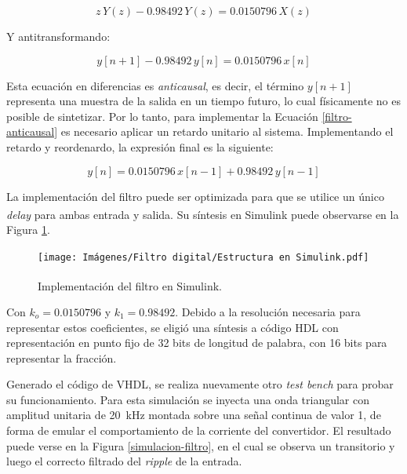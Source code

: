 \begin{equation*}
    z \, Y(z) - 0.98492 \, Y(z) = 0.0150796 \, X(z)
\end{equation*}

Y antitransformando:

\begin{equation}
    y[n+1] - 0.98492 \, y[n] = 0.0150796 \, x[n]
    \label{filtro-anticausal}
\end{equation}

Esta ecuación en diferencias es \emph{anticausal}, es decir, el término $y[n+1]$ representa una muestra de la salida en un tiempo futuro, lo cual físicamente no es posible de sintetizar. Por lo tanto, para implementar la Ecuación \ref{filtro-anticausal} es necesario aplicar un retardo unitario al sistema. Implementando el retardo y reordenardo, la expresión final es la siguiente:

\begin{equation}
    \boxed{y[n] = 0.0150796 \, x[n-1] + 0.98492 \, y[n-1]}
\end{equation}

La implementación del filtro puede ser optimizada para que se utilice un único \emph{delay} para ambas entrada y salida. Su síntesis en Simulink\textsuperscript\textregistered \hspace{0.6pt} puede observarse en la Figura \ref{estructura-filtro}.

\begin{figure}[hbt!]
    \centering
    \texttt{[image: Imágenes/Filtro digital/Estructura en Simulink.pdf]}    
    \caption{Implementación del filtro en Simulink\textsuperscript\textregistered.}
    \label{estructura-filtro}
\end{figure}

Con $k_o = 0.0150796$ y $k_1 = 0.98492$. Debido a la resolución necesaria para representar estos coeficientes, se eligió una síntesis a código HDL con representación en punto fijo de 32 bits de longitud de palabra, con 16 bits para representar la fracción.

Generado el código de VHDL, se realiza nuevamente otro \emph{test bench} para probar su funcionamiento. Para esta simulación se inyecta una onda triangular con amplitud unitaria de \SI{20}{\kilo\hertz} montada sobre una señal continua de valor 1, de forma de emular el comportamiento de la corriente del convertidor. El resultado puede verse en la Figura \ref{simulacion-filtro}, en el cual se observa un transitorio y luego el correcto filtrado del \emph{ripple} de la entrada.

